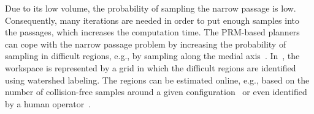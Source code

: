\documentclass[usletter, 10pt, conference]{ieeeconf} %
\def\C{\mathcal{C}}
\begin{document}
Due to its low volume, the probability of sampling the narrow passage is low.
Consequently, many iterations are needed in order to put enough samples into the passages, which increases the computation time.
The PRM-based planners can cope with the narrow passage problem by increasing the probability of sampling in difficult regions, e.g., by sampling along the medial axis~\cite{amatoOBRRT,amato2002using,wilmarthMAPRM}.
In~\cite{bergWIG}, the workspace is represented by a grid in which the difficult regions are identified using watershed labeling.
The regions can be estimated online, e.g., based on the number of collision-free samples around a given configuration~\cite{overmarsGauss,hsuBridge} or even identified by a human operator~\cite{denny2018general}. 

\end{document}
